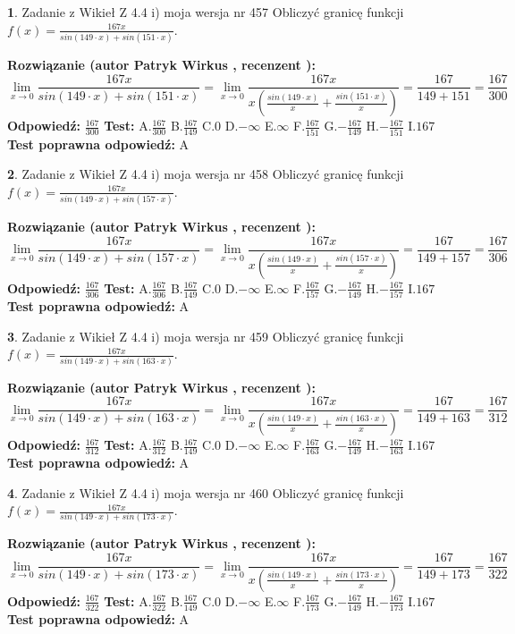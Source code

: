 \documentclass[12pt, a4paper]{article}
\theoremstyle{definition} %
\newtheorem{zad}{}
\newcommand{\zadStart}[1]{\begin{zad}#1\newline}
\newcommand{\zadStop}{\end{zad}}
\newcommand{\rozwStart}[2]{\noindent \textbf{Rozwiązanie (autor #1 , recenzent #2): }\newline}
\newcommand{\rozwStop}{\newline}
\newcommand{\odpStart}{\noindent \textbf{Odpowiedź:}\newline}
\newcommand{\odpStop}{\newline}
\newcommand{\testStart}{\noindent \textbf{Test:}\newline}
\newcommand{\testStop}{\newline}
\newcommand{\kluczStart}{\noindent \textbf{Test poprawna odpowiedź:}\newline}
\newcommand{\kluczStop}{\newline}
\begin{document}
\zadStart{Zadanie z Wikieł Z 4.4 i) moja wersja nr 457}
Obliczyć granicę funkcji $f(x)=\frac{167x}{sin(149\cdot x) +sin(151\cdot x)}$.
\zadStop
\rozwStart{Patryk Wirkus}{}
$$\lim\limits_{x\to 0}\frac{167x}{sin(149\cdot x) +sin(151\cdot x)}=\lim\limits_{x\to 0}\frac{167x}{x(\frac{sin(149\cdot x)}{x}+\frac{sin(151\cdot x)}{x})}=\frac{167}{149+151} = \frac{167}{300}$$
\rozwStop
\odpStart
$\frac{167}{300}$
\odpStop
\testStart
A.$\frac{167}{300}$
B.$\frac{167}{149}$
C.$0$
D.$-\infty$
E.$\infty$
F.$\frac{167}{151}$
G.$-\frac{167}{149}$
H.$-\frac{167}{151}$
I.$167$
\testStop
\kluczStart
A
\kluczStop



\zadStart{Zadanie z Wikieł Z 4.4 i) moja wersja nr 458}
Obliczyć granicę funkcji $f(x)=\frac{167x}{sin(149\cdot x) +sin(157\cdot x)}$.
\zadStop
\rozwStart{Patryk Wirkus}{}
$$\lim\limits_{x\to 0}\frac{167x}{sin(149\cdot x) +sin(157\cdot x)}=\lim\limits_{x\to 0}\frac{167x}{x(\frac{sin(149\cdot x)}{x}+\frac{sin(157\cdot x)}{x})}=\frac{167}{149+157} = \frac{167}{306}$$
\rozwStop
\odpStart
$\frac{167}{306}$
\odpStop
\testStart
A.$\frac{167}{306}$
B.$\frac{167}{149}$
C.$0$
D.$-\infty$
E.$\infty$
F.$\frac{167}{157}$
G.$-\frac{167}{149}$
H.$-\frac{167}{157}$
I.$167$
\testStop
\kluczStart
A
\kluczStop



\zadStart{Zadanie z Wikieł Z 4.4 i) moja wersja nr 459}
Obliczyć granicę funkcji $f(x)=\frac{167x}{sin(149\cdot x) +sin(163\cdot x)}$.
\zadStop
\rozwStart{Patryk Wirkus}{}
$$\lim\limits_{x\to 0}\frac{167x}{sin(149\cdot x) +sin(163\cdot x)}=\lim\limits_{x\to 0}\frac{167x}{x(\frac{sin(149\cdot x)}{x}+\frac{sin(163\cdot x)}{x})}=\frac{167}{149+163} = \frac{167}{312}$$
\rozwStop
\odpStart
$\frac{167}{312}$
\odpStop
\testStart
A.$\frac{167}{312}$
B.$\frac{167}{149}$
C.$0$
D.$-\infty$
E.$\infty$
F.$\frac{167}{163}$
G.$-\frac{167}{149}$
H.$-\frac{167}{163}$
I.$167$
\testStop
\kluczStart
A
\kluczStop



\zadStart{Zadanie z Wikieł Z 4.4 i) moja wersja nr 460}
Obliczyć granicę funkcji $f(x)=\frac{167x}{sin(149\cdot x) +sin(173\cdot x)}$.
\zadStop
\rozwStart{Patryk Wirkus}{}
$$\lim\limits_{x\to 0}\frac{167x}{sin(149\cdot x) +sin(173\cdot x)}=\lim\limits_{x\to 0}\frac{167x}{x(\frac{sin(149\cdot x)}{x}+\frac{sin(173\cdot x)}{x})}=\frac{167}{149+173} = \frac{167}{322}$$
\rozwStop
\odpStart
$\frac{167}{322}$
\odpStop
\testStart
A.$\frac{167}{322}$
B.$\frac{167}{149}$
C.$0$
D.$-\infty$
E.$\infty$
F.$\frac{167}{173}$
G.$-\frac{167}{149}$
H.$-\frac{167}{173}$
I.$167$
\testStop
\kluczStart
A
\kluczStop
\end{document}
